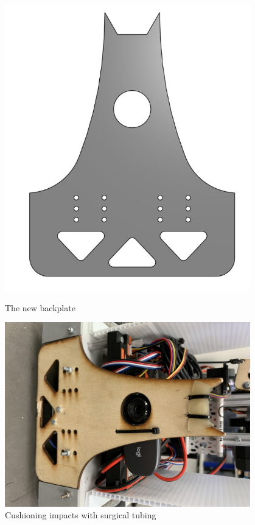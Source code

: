 \begin{figure}[ht]
\centering
\begin{minipage}[b]{.48\textwidth}
  \centering
  \includegraphics[width=0.95\textwidth]{Meetings/November/11-09-21/11-9-21_Hardware_Figure3 - Nathan Forrer.JPG}
  \caption{The new backplate}
  \label{fig:110921_3}
\end{minipage}%
\hfill%
\begin{minipage}[b]{.48\textwidth}
  \centering
  \includegraphics[width=0.95\textwidth]{Meetings/November/11-09-21/11-9-21_Hardware_Figure4 - Nathan Forrer.JPG}
  \caption{Cushioning impacts with surgical tubing}
  \label{fig:110921_4}
\end{minipage}
\end{figure}


